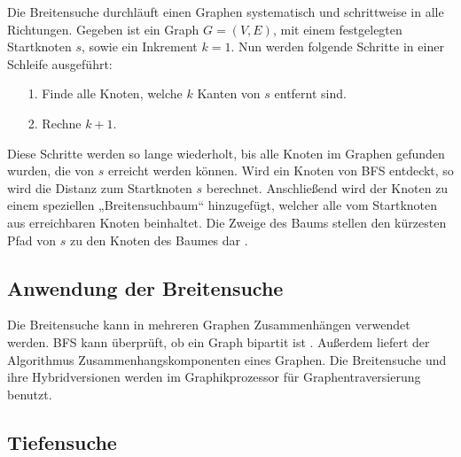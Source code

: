 Die Breitensuche durchläuft einen Graphen systematisch und schrittweise in alle Richtungen. Gegeben ist ein Graph $G = (V, E)$, mit einem festgelegten Startknoten $s$, sowie ein Inkrement $k=1$. Nun werden folgende Schritte in einer Schleife ausgeführt:
\begin{itemize}
\item[1.] Finde alle Knoten, welche $k$ Kanten von $s$ entfernt sind.
\item[2.] Rechne $k + 1$.
\end{itemize}
Diese Schritte werden so lange wiederholt, bis alle Knoten im Graphen gefunden wurden, die von $s$ erreicht werden können. Wird ein Knoten von BFS entdeckt, so wird die Distanz zum Startknoten $s$ berechnet. Anschließend wird der Knoten zu einem speziellen „Breitensuchbaum“ hinzugefügt, welcher alle vom Startknoten aus erreichbaren Knoten beinhaltet. Die Zweige des Baums stellen den kürzesten Pfad von $s$ zu den Knoten des Baumes dar \cite{Cormen.2009}.

\subsection{Anwendung der Breitensuche}
Die Breitensuche kann in mehreren Graphen Zusammenhängen verwendet werden.  BFS kann überprüft, ob ein Graph bipartit ist \cite{propTest}. Außerdem liefert der Algorithmus Zusammenhangskomponenten eines Graphen\cite{schmitz}. Die Breitensuche und ihre Hybridversionen\cite{effHyb} werden im Graphikprozessor für Graphentraversierung benutzt\cite{scaleGPU}. %

\subsection{Tiefensuche}

